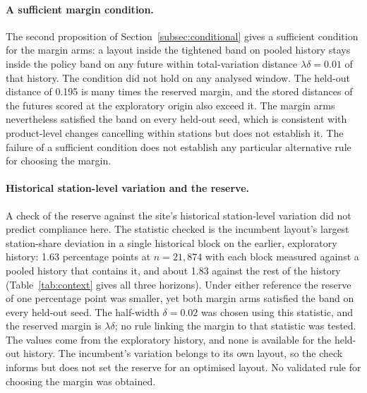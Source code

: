 \paragraph{A sufficient margin condition.} The second proposition of Section~\ref{subsec:conditional} gives a sufficient condition for the margin arms: a layout inside the tightened band on pooled history stays inside the policy band on any future within total-variation distance $\lambda\delta=0.01$ of that history. The condition did not hold on any analysed window. The held-out distance of 0.195 is many times the reserved margin, and the stored distances of the futures scored at the exploratory origin also exceed it. The margin arms nevertheless satisfied the band on every held-out seed, which is consistent with product-level changes cancelling within stations but does not establish it. The failure of a sufficient condition does not establish any particular alternative rule for choosing the margin.

\paragraph{Historical station-level variation and the reserve.} A check of the reserve against the site's historical station-level variation did not predict compliance here. The statistic checked is the incumbent layout's largest station-share deviation in a single historical block on the earlier, exploratory history: 1.63 percentage points at $n=21{,}874$ with each block measured against a pooled history that contains it, and about 1.83 against the rest of the history (Table~\ref{tab:context} gives all three horizons). Under either reference the reserve of one percentage point was smaller, yet both margin arms satisfied the band on every held-out seed. The half-width $\delta=0.02$ was chosen using this statistic, and the reserved margin is $\lambda\delta$; no rule linking the margin to that statistic was tested. The values come from the exploratory history, and none is available for the held-out history. The incumbent's variation belongs to its own layout, so the check informs but does not set the reserve for an optimised layout. No validated rule for choosing the margin was obtained.

